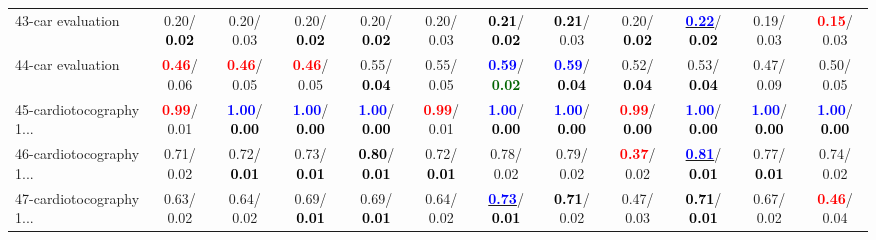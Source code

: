 \begin{table}[h]
\begin{center}
{\begin{tabular}{lc|c|c|c|c|c|c|c|c|c|c}
43-car evaluation &   0.20/\textcolor{black}{\textbf{  0.02}} &   0.20/  0.03 &   0.20/\textcolor{black}{\textbf{  0.02}} &   0.20/\textcolor{black}{\textbf{  0.02}} &   0.20/  0.03 & \textcolor{black}{\textbf{  0.21}}/\textcolor{black}{\textbf{  0.02}} & \textcolor{black}{\textbf{  0.21}}/  0.03 &   0.20/\textcolor{black}{\textbf{  0.02}} & \underline{\textcolor{blue}{\textbf{  0.22}}}/\textcolor{black}{\textbf{  0.02}} &   0.19/  0.03 & \textcolor{red}{\textbf{  0.15}}/  0.03 \\
44-car evaluation & \textcolor{red}{\textbf{  0.46}}/  0.06 & \textcolor{red}{\textbf{  0.46}}/  0.05 & \textcolor{red}{\textbf{  0.46}}/  0.05 &   0.55/\textcolor{black}{\textbf{  0.04}} &   0.55/  0.05 & \textcolor{blue}{\textbf{  0.59}}/\textcolor{darkgreen}{\textbf{  0.02}} & \textcolor{blue}{\textbf{  0.59}}/\textcolor{black}{\textbf{  0.04}} &   0.52/\textcolor{black}{\textbf{  0.04}} &   0.53/\textcolor{black}{\textbf{  0.04}} &   0.47/  0.09 &   0.50/  0.05 \\
45-cardiotocography 1... & \textcolor{red}{\textbf{  0.99}}/  0.01 & \textcolor{blue}{\textbf{  1.00}}/\textcolor{black}{\textbf{  0.00}} & \textcolor{blue}{\textbf{  1.00}}/\textcolor{black}{\textbf{  0.00}} & \textcolor{blue}{\textbf{  1.00}}/\textcolor{black}{\textbf{  0.00}} & \textcolor{red}{\textbf{  0.99}}/  0.01 & \textcolor{blue}{\textbf{  1.00}}/\textcolor{black}{\textbf{  0.00}} & \textcolor{blue}{\textbf{  1.00}}/\textcolor{black}{\textbf{  0.00}} & \textcolor{red}{\textbf{  0.99}}/\textcolor{black}{\textbf{  0.00}} & \textcolor{blue}{\textbf{  1.00}}/\textcolor{black}{\textbf{  0.00}} & \textcolor{blue}{\textbf{  1.00}}/\textcolor{black}{\textbf{  0.00}} & \textcolor{blue}{\textbf{  1.00}}/\textcolor{black}{\textbf{  0.00}} \\
46-cardiotocography 1... &   0.71/  0.02 &   0.72/\textcolor{black}{\textbf{  0.01}} &   0.73/\textcolor{black}{\textbf{  0.01}} & \textcolor{black}{\textbf{  0.80}}/\textcolor{black}{\textbf{  0.01}} &   0.72/\textcolor{black}{\textbf{  0.01}} &   0.78/  0.02 &   0.79/  0.02 & \textcolor{red}{\textbf{  0.37}}/  0.02 & \underline{\textcolor{blue}{\textbf{  0.81}}}/\textcolor{black}{\textbf{  0.01}} &   0.77/\textcolor{black}{\textbf{  0.01}} &   0.74/  0.02 \\ \hline
47-cardiotocography 1... &   0.63/  0.02 &   0.64/  0.02 &   0.69/\textcolor{black}{\textbf{  0.01}} &   0.69/\textcolor{black}{\textbf{  0.01}} &   0.64/  0.02 & \underline{\textcolor{blue}{\textbf{  0.73}}}/\textcolor{black}{\textbf{  0.01}} & \textcolor{black}{\textbf{  0.71}}/  0.02 &   0.47/  0.03 & \textcolor{black}{\textbf{  0.71}}/\textcolor{black}{\textbf{  0.01}} &   0.67/  0.02 & \textcolor{red}{\textbf{  0.46}}/  0.04 \\

\end{tabular}}
\end{center}
\end{table}
